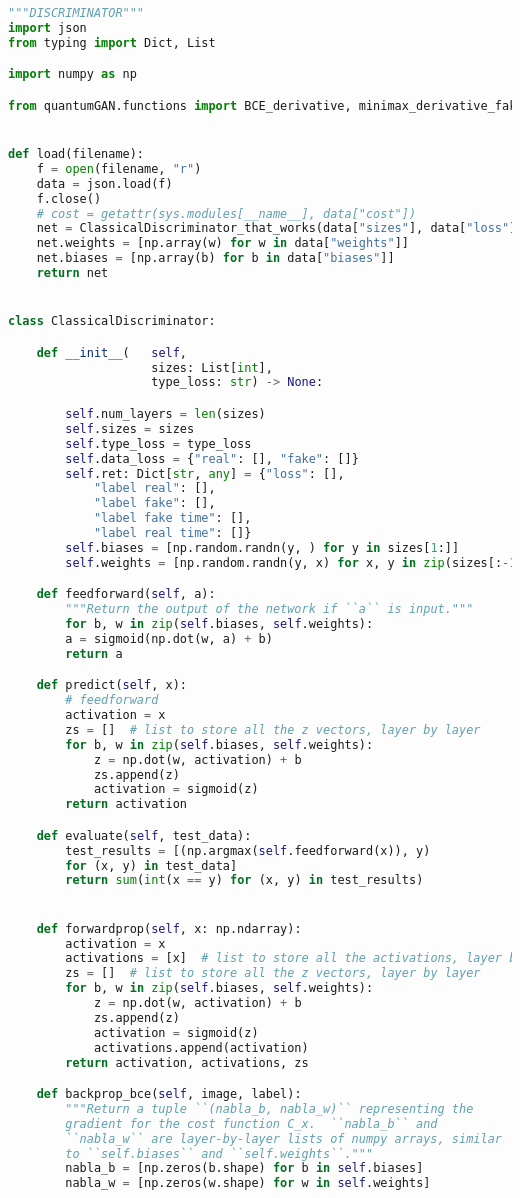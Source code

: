 \begin{lstlisting}[language=Python, caption=Codi final pel discriminador]
"""DISCRIMINATOR"""
import json
from typing import Dict, List

import numpy as np

from quantumGAN.functions import BCE_derivative, minimax_derivative_fake, minimax_derivative_real, sigmoid, sigmoid_prime


def load(filename):
	f = open(filename, "r")
	data = json.load(f)
	f.close()
	# cost = getattr(sys.modules[__name__], data["cost"])
	net = ClassicalDiscriminator_that_works(data["sizes"], data["loss"])
	net.weights = [np.array(w) for w in data["weights"]]
	net.biases = [np.array(b) for b in data["biases"]]
	return net


class ClassicalDiscriminator:

	def __init__(	self,
					sizes: List[int],
					type_loss: str) -> None:

		self.num_layers = len(sizes)
		self.sizes = sizes
		self.type_loss = type_loss
		self.data_loss = {"real": [], "fake": []}
		self.ret: Dict[str, any] = {"loss": [],
			"label real": [],
			"label fake": [],
			"label fake time": [],
			"label real time": []}
		self.biases = [np.random.randn(y, ) for y in sizes[1:]]
		self.weights = [np.random.randn(y, x) for x, y in zip(sizes[:-1], sizes[1:])]

	def feedforward(self, a):
		"""Return the output of the network if ``a`` is input."""
		for b, w in zip(self.biases, self.weights):
		a = sigmoid(np.dot(w, a) + b)
		return a

	def predict(self, x):
		# feedforward
		activation = x
		zs = []  # list to store all the z vectors, layer by layer
		for b, w in zip(self.biases, self.weights):
			z = np.dot(w, activation) + b
			zs.append(z)
			activation = sigmoid(z)
		return activation

	def evaluate(self, test_data):
		test_results = [(np.argmax(self.feedforward(x)), y)
		for (x, y) in test_data]
		return sum(int(x == y) for (x, y) in test_results)


	def forwardprop(self, x: np.ndarray):
		activation = x
		activations = [x]  # list to store all the activations, layer by layer
		zs = []  # list to store all the z vectors, layer by layer
		for b, w in zip(self.biases, self.weights):
			z = np.dot(w, activation) + b
			zs.append(z)
			activation = sigmoid(z)
			activations.append(activation)
		return activation, activations, zs

	def backprop_bce(self, image, label):
		"""Return a tuple ``(nabla_b, nabla_w)`` representing the
		gradient for the cost function C_x.  ``nabla_b`` and
		``nabla_w`` are layer-by-layer lists of numpy arrays, similar
		to ``self.biases`` and ``self.weights``."""
		nabla_b = [np.zeros(b.shape) for b in self.biases]
		nabla_w = [np.zeros(w.shape) for w in self.weights]


\end{lstlisting}
